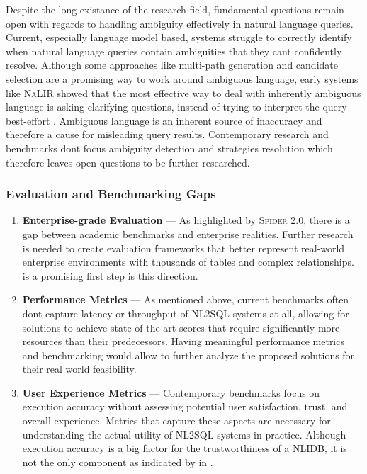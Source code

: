 \documentclass{article}
\begin{document}
Despite the long existance of the research field, fundamental questions remain open with regards to handling ambiguity effectively
in natural language queries. Current, especially language model based, systems struggle to correctly identify when natural language
queries contain ambiguities that they cant confidently resolve. Although some approaches like multi-path generation and candidate 
selection are a promising way to work around ambiguous language, early systems like \textsc{NaLIR} showed that the most effective 
way to deal with inherently ambiguous language is asking clarifying questions, instead of trying to interpret the query best-effort
\citep{NALIR}. Ambiguous language is an inherent source of inaccuracy and therefore a cause for misleading query results. 
Contemporary research and benchmarks dont focus ambiguity detection and strategies resolution which therefore leaves open
questions to be further researched.

\subsubsection{Evaluation and Benchmarking Gaps}

\begin{enumerate}
    \item \textbf{Enterprise-grade Evaluation} — As highlighted by \textsc{Spider 2.0}, there is a gap between academic 
          benchmarks and enterprise realities. Further research is needed to create evaluation frameworks that better represent 
          real-world enterprise environments with thousands of tables and complex relationships. \cite{Spider2} is a promising 
          first step is this direction.
    \item \textbf{Performance Metrics} — As mentioned above, current benchmarks often dont capture latency or throughput of NL2SQL 
          systems at all, allowing for solutions to achieve state-of-the-art scores that require significantly more resources than 
          their predecessors. Having meaningful performance metrics and benchmarking would allow to further analyze the proposed 
          solutions for their real world feasibility.
    \item \textbf{User Experience Metrics} — Contemporary benchmarks focus on execution accuracy without assessing potential
          user satisfaction, trust, and overall experience. Metrics that capture these aspects are necessary for understanding the 
          actual utility of NL2SQL systems in practice. Although execution accuracy is a big factor for the trustworthiness of a 
          NLIDB, it is not the only component as indicated by \citeauthor*{NALIR} in \citeyear{NALIR}.
\end{enumerate}
\end{document}
